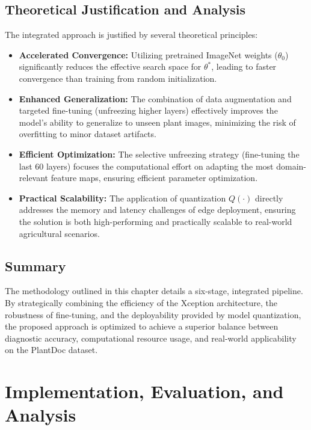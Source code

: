 \documentclass[12pt, a4paper]{report}
\begin{document}
\section{Theoretical Justification and Analysis}
\label{sec:theoretical_analysis}
\noindent %
The integrated approach is justified by several theoretical principles:
\begin{itemize}
    \item \textbf{Accelerated Convergence:} Utilizing pretrained ImageNet weights ($\theta_0$) significantly reduces the effective search space for $\theta^*$, leading to faster convergence than training from random initialization.
    \item \textbf{Enhanced Generalization:} The combination of data augmentation and targeted fine-tuning (unfreezing higher layers) effectively improves the model's ability to generalize to unseen plant images, minimizing the risk of overfitting to minor dataset artifacts.
    \item \textbf{Efficient Optimization:} The selective unfreezing strategy (fine-tuning the last 60 layers) focuses the computational effort on adapting the most domain-relevant feature maps, ensuring efficient parameter optimization.
    \item \textbf{Practical Scalability:} The application of quantization $Q(\cdot)$ directly addresses the memory and latency challenges of edge deployment, ensuring the solution is both high-performing and practically scalable to real-world agricultural scenarios.
\end{itemize}

\section{Summary}
\noindent %
The methodology outlined in this chapter details a six-stage, integrated pipeline. By strategically combining the efficiency of the Xception architecture, the robustness of fine-tuning, and the deployability provided by model quantization, the proposed approach is optimized to achieve a superior balance between diagnostic accuracy, computational resource usage, and real-world applicability on the PlantDoc dataset.
\newpage
\chapter{Implementation, Evaluation, and Analysis}
\label{chap:implementation}
\end{document}
